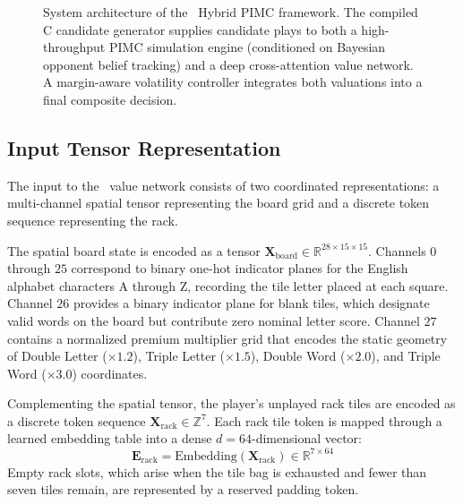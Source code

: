 \begin{figure}[t]
\caption{System architecture of the \algo\ Hybrid PIMC framework. The compiled C candidate generator supplies candidate plays to both a high-throughput PIMC simulation engine (conditioned on Bayesian opponent belief tracking) and a deep cross-attention value network. A margin-aware volatility controller integrates both valuations into a final composite decision.}
\label{fig:architecture}
\end{figure}

\subsection{Input Tensor Representation}

The input to the \algo\ value network consists of two coordinated representations: a multi-channel spatial tensor representing the board grid and a discrete token sequence representing the rack. 

The spatial board state is encoded as a tensor $\mathbf{X}_{\mathrm{board}} \in \mathbb{R}^{28 \times 15 \times 15}$. Channels $0$ through $25$ correspond to binary one-hot indicator planes for the English alphabet characters $\text{A}$ through $\text{Z}$, recording the tile letter placed at each square. Channel $26$ provides a binary indicator plane for blank tiles, which designate valid words on the board but contribute zero nominal letter score. Channel $27$ contains a normalized premium multiplier grid that encodes the static geometry of Double Letter ($\times 1.2$), Triple Letter ($\times 1.5$), Double Word ($\times 2.0$), and Triple Word ($\times 3.0$) coordinates. 

Complementing the spatial tensor, the player's unplayed rack tiles are encoded as a discrete token sequence $\mathbf{X}_{\mathrm{rack}} \in \mathbb{Z}^7$. Each rack tile token is mapped through a learned embedding table into a dense $d = 64$-dimensional vector:
\begin{equation}
    \mathbf{E}_{\mathrm{rack}} = \mathrm{Embedding}(\mathbf{X}_{\mathrm{rack}}) \in \mathbb{R}^{7 \times 64}
\end{equation}
Empty rack slots, which arise when the tile bag is exhausted and fewer than seven tiles remain, are represented by a reserved padding token.

